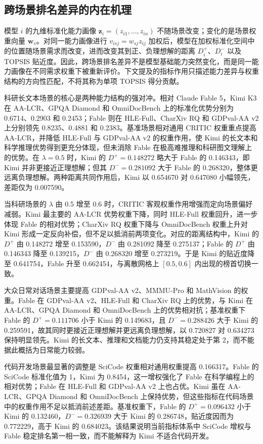 \documentclass[UTF8,zihao=-4,a4paper,fontset=none]{ctexart}
\begin{document}
\subsection{跨场景排名差异的内在机理}

模型 $i$ 的九维标准化能力画像 $\bm z_i=(z_{i1},\ldots,z_{in})$ 不随场景改变；变化的是场景权重向量 $\bm w_s$。对同一能力画像进行 $v_{isj}=w_{sj}z_{ij}$ 加权后，模型在加权标准化空间中的位置随场景需求而改变，进而改变其到正、负理想解的距离 $D_i^+$、$D_i^-$ 以及 TOPSIS 贴近度。因此，跨场景排名差异不是模型基础能力突然变化，而是同一能力画像在不同需求权重下被重新评价。下文提及的指标作用只描述能力差异与权重结构的方向性匹配，不将其称为单项 TOPSIS 得分贡献。

科研长文本场景的核心是两种能力结构的强对冲。相对 Claude Fable 5，Kimi K3 在 AA-LCR、GPQA Diamond 和 OmniDocBench 上的标准化优势分别为 0.6714、0.2903 和 0.2453；Fable 则在 HLE-Full、CharXiv RQ 和 GDPval-AA v2 上分别领先 0.8235、0.4881 和 0.2383。基准场景相对通用 CRITIC 权重重点提高 AA-LCR，并降低 HLE-Full 与 GDPval-AA v2 的权重作用，使 Kimi 的长文本和科学推理优势得到更充分体现，但未消除 Fable 在极高难推理和科研图文理解上的优势。在 $\lambda=0.5$ 时，Kimi 的 $D^+=0.148272$ 略大于 Fable 的 0.146343，即 Kimi 并非更接近正理想解；但其 $D^-=0.281092$ 大于 Fable 的 0.268320，整体更远离负理想解。两种距离共同作用后，Kimi 以 0.654670 对 0.647080 小幅领先，差距仅为 0.007590。

当科研场景的 $\lambda$ 由 0.5 增至 0.6 时，CRITIC 客观权重作用增强而定向场景偏好减弱。Kimi 最主要的 AA-LCR 优势权重下降，同时 HLE-Full 权重回升，进一步体现 Fable 的相对优势；CharXiv RQ 权重下降与 OmniDocBench 权重上升对 Kimi 形成一定反向补偿，但不足以抵消前两项变化。对应的距离结构中，Kimi 的 $D^+$ 由 0.148272 增至 0.153590，$D^-$ 由 0.281092 降至 0.275137；Fable 的 $D^+$ 由 0.146343 降至 0.139215，$D^-$ 由 0.268320 增至 0.273219。于是 Kimi 的贴近度降至 0.641754，Fable 升至 0.662454，与离散网格上 $[0.5,0.6]$ 内出现的榜首切换一致。

大众日常对话场景主要提高 GDPval-AA v2、MMMU-Pro 和 MathVision 的权重。Fable 在 GDPval-AA v2、HLE-Full 和 CharXiv RQ 上的优势，与 Kimi 在 AA-LCR、GPQA Diamond 和 OmniDocBench 上的优势相对抗；基准权重下 Fable 的 $D^+=0.111706$ 小于 Kimi 的 0.149683，且 $D^-=0.288426$ 大于 Kimi 的 0.259591，故其同时更接近正理想解并更远离负理想解，以 0.720827 对 0.634273 保持明显领先。Kimi 的长文本、推理和文档能力仍支持其稳定处于第 2，而不能据此概括为日常能力较弱。

代码开发场景最显著的调整是 SciCode 权重相对通用权重提高 0.166317。Fable 的 SciCode 标准化值为 1，Kimi 为 0.8454，这一增权强化了 Fable 在科学编程上的相对优势；Fable 在 HLE-Full 和 GDPval-AA v2 上也占优。Kimi 虽在 AA-LCR、GPQA Diamond 和 OmniDocBench 上保持优势，但这些指标在代码场景中的权重作用不足以抵消前述差距。基准权重下，Fable 的 $D^+=0.096432$ 小于 Kimi 的 0.132460，$D^-=0.326939$ 大于 Kimi 的 0.286748，贴近度因而为 0.772229，高于 Kimi 的 0.684023。该结果说明当前指标体系中 SciCode 增权与 Fable 稳定排名第一相一致，而不能解释为 Kimi 不适合代码开发。
\end{document}
